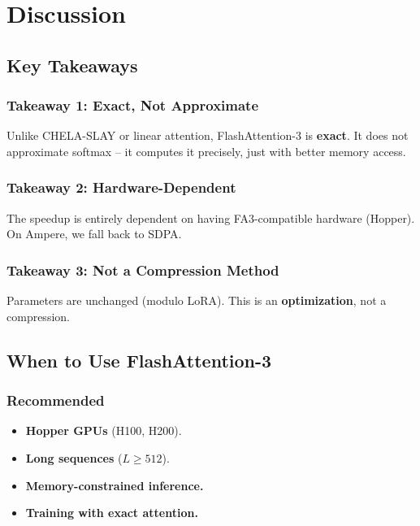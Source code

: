 \section{Discussion}

\subsection{Key Takeaways}

\subsubsection{Takeaway 1: Exact, Not Approximate}

Unlike CHELA-SLAY or linear attention, FlashAttention-3 is \textbf{exact}. It 
does not approximate softmax -- it computes it precisely, just with better 
memory access.

\subsubsection{Takeaway 2: Hardware-Dependent}

The speedup is entirely dependent on having FA3-compatible hardware 
(Hopper). On Ampere, we fall back to SDPA.

\subsubsection{Takeaway 3: Not a Compression Method}

Parameters are unchanged (modulo LoRA). This is an \textbf{optimization}, not a 
compression.

\subsection{When to Use FlashAttention-3}

\subsubsection{Recommended}
\begin{itemize}
\item \textbf{Hopper GPUs} (H100, H200).
\item \textbf{Long sequences} ($L \geq 512$).
\item \textbf{Memory-constrained inference.}
\item \textbf{Training with exact attention.}

\end{itemize}
